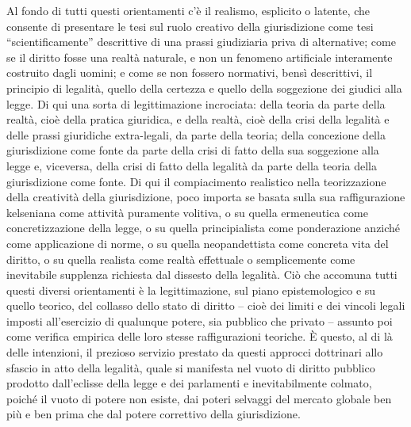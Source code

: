 Al fondo di tutti questi orientamenti c’è il realismo, esplicito o latente, che consente di presentare le tesi sul ruolo creativo della giurisdizione come tesi “scientificamente” descrittive di una prassi giudiziaria priva di alternative; come se il diritto fosse una realtà naturale, e non un fenomeno artificiale interamente costruito dagli uomini; e come se non fossero normativi, bensì descrittivi, il principio di legalità, quello della certezza e quello della soggezione dei giudici alla legge. Di qui una sorta di legittimazione incrociata: della teoria da parte della realtà, cioè della pratica giuridica, e della realtà, cioè della crisi della legalità e delle prassi giuridiche extra-legali, da parte della teoria; della concezione della giurisdizione come fonte da parte della crisi di fatto della sua soggezione alla legge e, viceversa, della crisi di fatto della legalità da parte della teoria della giurisdizione come fonte. Di qui il compiacimento realistico nella teorizzazione della creatività della giurisdizione, poco importa se basata sulla sua raffigurazione kelseniana come attività puramente volitiva, o su quella ermeneutica come concretizzazione della legge, o su quella principialista come ponderazione anziché come applicazione di norme, o su quella neopandettista come concreta vita del diritto, o su quella realista come realtà effettuale o semplicemente come inevitabile supplenza richiesta dal dissesto della legalità. Ciò che accomuna tutti questi diversi orientamenti è la legittimazione, sul piano epistemologico e su quello teorico, del collasso dello stato di diritto – cioè dei limiti e dei vincoli legali imposti all’esercizio di qualunque potere, sia pubblico che privato – assunto poi come verifica empirica delle loro stesse raffigurazioni teoriche. È questo, al di là delle intenzioni, il prezioso servizio prestato da questi approcci dottrinari allo sfascio in atto della legalità, quale si manifesta nel vuoto di diritto pubblico prodotto dall’eclisse della legge e dei parlamenti e inevitabilmente colmato, poiché il vuoto di potere non esiste, dai poteri selvaggi del mercato globale ben più e ben prima che dal potere correttivo della giurisdizione.
